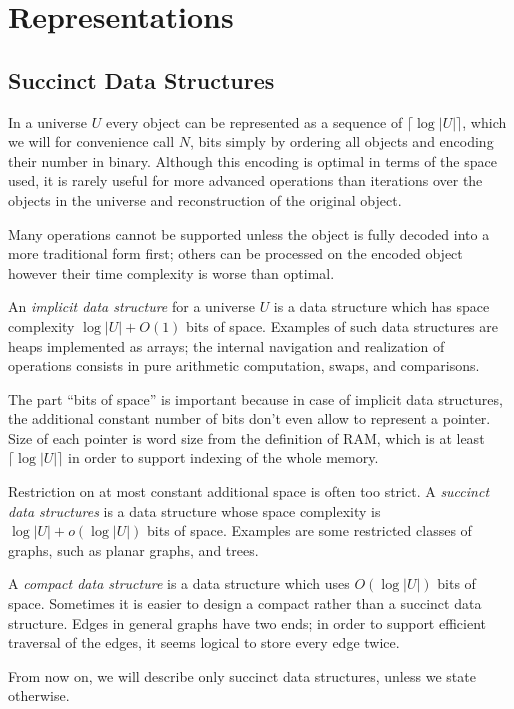 \chapter{Representations}


\section{Succinct Data Structures}

In a universe $U$ every object can be represented as a sequence of $\lceil \log |U| \rceil$, which we will for convenience call $N$, bits simply by ordering all objects and encoding their number in binary.
Although this encoding is optimal in terms of the space used, it is rarely useful for more advanced operations than iterations over the objects in the universe and reconstruction of the original object.

Many operations cannot be supported unless the object is fully decoded into a more traditional form first; others can be processed on the encoded object however their time complexity is worse than optimal.

An \emph{implicit data structure} for a universe $U$ is a data structure which has space complexity $ \log |U| + O(1) $ bits of space.
Examples of such data structures are heaps implemented as arrays; the internal navigation and realization of operations consists in pure arithmetic computation, swaps, and comparisons.

The part ``bits of space'' is important because in case of implicit data structures, the additional constant number of bits don't even allow to represent a pointer.
Size of each pointer is word size from the definition of RAM, which is at least $\lceil \log |U| \rceil$ in order to support indexing of the whole memory.

Restriction on at most constant additional space is often too strict.
A \emph{succinct data structures} is a data structure whose space complexity is $ \log |U| + o(\log |U|) $ bits of space.
Examples are some restricted classes of graphs, such as planar graphs, and trees.

A \emph{compact data structure} is a data structure which uses $ O(\log |U|) $ bits of space.
Sometimes it is easier to design a compact rather than a succinct data structure.
Edges in general graphs have two ends; in order to support efficient traversal of the edges, it seems logical to store every edge twice.

From now on, we will describe only succinct data structures, unless we state otherwise.

